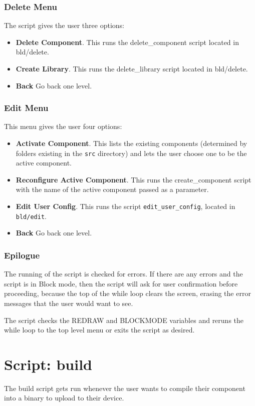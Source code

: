 \documentclass[a4paper, oneside, 11pt, titlepage, onecolumn, openright]{report}
\begin{document}
\subsubsection{Delete Menu}
			\label{sss:VFstartDeleteMenu}
			The script gives the user three options:
\begin{itemize}
\item \textbf{Delete Component}. This runs the delete\_component script located in bld/delete.
\item \textbf{Create Library}. This runs the delete\_library script located in bld/delete.
\item \textbf{Back} Go back one level.
\end{itemize}			


\subsubsection{Edit Menu}
			\label{sss:VFstartEditMenu}
			This menu gives the user four options:
\begin{itemize}
\item \textbf{Activate Component}. This lists the existing components (determined by folders existing in the \texttt{src} directory) and lets the user choose one to be the active component.
\item \textbf{Reconfigure Active Component}. This runs the create\_component script with the name of the active component passed as a parameter.
\item \textbf{Edit User Config}. This runs the script \texttt{edit\_user\_config}, located in \texttt{bld/edit}. 
\item \textbf{Back} Go back one level.
\end{itemize}					

\subsubsection{Epilogue}
			\label{sss:VFstartEpilogue}
			The running of the script is checked for errors. If there are any errors and the script is in Block mode, then the script will ask for user confirmation before proceeding, because the top of the while loop clears the screen, erasing the error messages that the user would want to see.
			
			The script checks the REDRAW and BLOCKMODE variables and reruns the while loop to the top level menu or exits the script as desired.
			
\section{Script: build}
			\label{s:build}
			The build script gets run whenever the user wants to compile their component into a binary to upload to their device.
			
\end{document}
